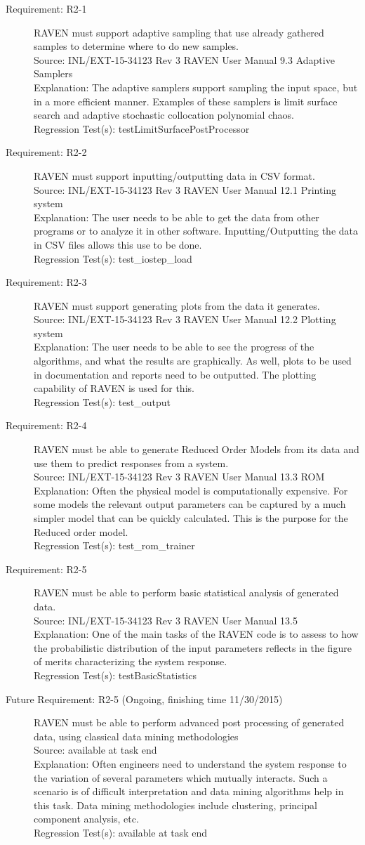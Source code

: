 \documentclass{article}
\newcommand{\requirement}[5]{\item[Requirement: #1] #2 \\Source: #3\\Explanation: #4\\Regression Test(s): #5}
\newcommand{\futurerequirement}[6]{\item[Future Requirement: #1 #6] #2 \\Source: #3\\Explanation: #4\\Regression Test(s): #5}
\begin{document}
\begin{description}

\requirement{R2-1}{RAVEN must support adaptive sampling that use already gathered samples to determine where to do new samples.}
{INL/EXT-15-34123 Rev 3 RAVEN User Manual 9.3 Adaptive Samplers}
{The adaptive samplers support sampling the input space, but in a more efficient manner.  Examples of these samplers is limit surface search and adaptive stochastic collocation polynomial chaos.}
{testLimitSurfacePostProcessor}

\requirement{R2-2}{RAVEN must support inputting/outputting data in CSV format.}
{INL/EXT-15-34123 Rev 3 RAVEN User Manual 12.1 Printing system}
{The user needs to be able to get the data from other programs or to analyze it in other software.  Inputting/Outputting the data in CSV files allows this use to be done.}
{test\_iostep\_load}

\requirement{R2-3}{RAVEN must support generating plots from the data it generates.}
{INL/EXT-15-34123 Rev 3 RAVEN User Manual 12.2 Plotting system}
{The user needs to be able to see the progress of the algorithms, and what the results are graphically.  As well, plots to be used in documentation and reports need to be outputted.  The plotting capability of RAVEN is used for this.}
{test\_output}

\requirement{R2-4}{RAVEN must be able to generate Reduced Order Models from its data and use them to predict responses from a system.}
{INL/EXT-15-34123 Rev 3 RAVEN User Manual 13.3 ROM}
{Often the physical model is computationally expensive.  For some models the relevant output parameters can be captured by a much simpler model that can be quickly calculated.  This is the purpose for the Reduced order model.}
{test\_rom\_trainer}

\requirement{R2-5}{RAVEN must be able to perform basic statistical analysis of generated data.}
{INL/EXT-15-34123 Rev 3 RAVEN User Manual 13.5}
{One of the main tasks of the RAVEN code is to assess to how the probabilistic distribution of the input parameters reflects in the figure of merits characterizing the system response.}
{testBasicStatistics}

\futurerequirement{R2-5}{RAVEN must be able to perform advanced post processing of generated data, using classical data mining methodologies}
{available at task end}
{Often engineers need to understand the system response to the variation of several parameters which mutually interacts. Such a scenario is of difficult interpretation and data mining algorithms help in this task.  Data mining methodologies include clustering, principal component analysis, etc.}
{available at task end}
{(Ongoing, finishing time 11/30/2015)}


\end{description}
\end{document}
